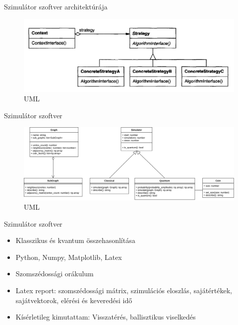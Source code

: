 \documentclass[aspectratio=169]{beamer}
\begin{document}
\begin{frame}{Szimulátor szoftver architektúrája}
\begin{figure}
        \includegraphics[width=\textwidth]{./tdk_figures/program/strategy.png}
        \caption{UML}
\end{figure}
\end{frame}

\begin{frame}{Szimulátor szoftver}
\begin{figure}
        \includegraphics[width=\textwidth]{./tdk_figures/program/uml.png}
        \caption{UML}
\end{figure}
\end{frame}

\begin{frame}{Szimulátor szoftver}
\begin{itemize}
    \item Klasszikus és kvantum összehasonlítása
    \item Python, Numpy, Matplotlib, Latex
    \item Szomszédossági orákulum
    \item Latex report: szomszédossági mátrix, szimulációs eloszlás, sajátértékek, sajátvektorok, elérési és keveredési idő
    \item Kísérletileg kimutattam: Visszatérés, ballisztikus viselkedés
\end{itemize}
\end{frame}
\end{document}
